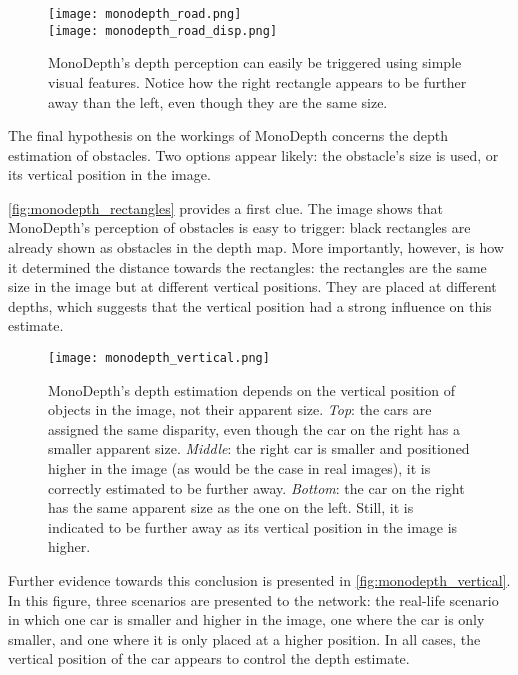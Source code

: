\medskip

\begin{figure}
\centering
\texttt{[image: monodepth\_road.png]}\\
\texttt{[image: monodepth\_road\_disp.png]}
\caption{MonoDepth's depth perception can easily be triggered using simple visual features. Notice how the right rectangle appears to be further away than the left, even though they are the same size.}
\label{fig:monodepth_rectangles}
\end{figure}

The final hypothesis on the workings of MonoDepth concerns the depth estimation of obstacles.
Two options appear likely: the obstacle's size is used, or its vertical position in the image.

\autoref{fig:monodepth_rectangles} provides a first clue.
The image shows that MonoDepth's perception of obstacles is easy to trigger: black rectangles are already shown as obstacles in the depth map.
More importantly, however, is how it determined the distance towards the rectangles: the rectangles are the same size in the image but at different vertical positions.
They are placed at different depths, which suggests that the vertical position had a strong influence on this estimate.

\begin{figure}
\centering
\texttt{[image: monodepth\_vertical.png]}
\caption{MonoDepth's depth estimation depends on the vertical position of objects in the image, not their apparent size.
\emph{Top}: the cars are assigned the same disparity, even though the car on the right has a smaller apparent size.
\emph{Middle}: the right car is smaller and positioned higher in the image (as would be the case in real images), it is correctly estimated to be further away.
\emph{Bottom}: the car on the right has the same apparent size as the one on the left. Still, it is indicated to be further away as its vertical position in the image is higher.}
\label{fig:monodepth_vertical}
\end{figure}

Further evidence towards this conclusion is presented in \autoref{fig:monodepth_vertical}.
In this figure, three scenarios are presented to the network: the real-life scenario in which one car is smaller and higher in the image, one where the car is only smaller, and one where it is only placed at a higher position.
In all cases, the vertical position of the car appears to control the depth estimate.

